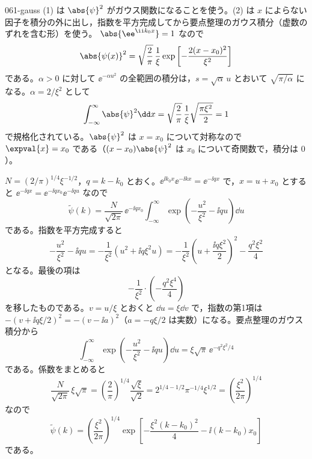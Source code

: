 \documentclass[uplatex,dvipdfmx,a4paper,11pt]{jsarticle}
\begin{document}
\begin{kaisetsu}{061-gauss}
\houshin (1) は $\abs{\psi}^{2}$ がガウス関数になることを使う。(2) は $x$ によらない因子を積分の外に出し，指数を平方完成してから要点整理のガウス積分（虚数のずれを含む形）を使う。
\keisan {} $\abs{\ee^{\ii k_{0}x}}=1$ なので
\[ \abs{\psi(x)}^{2}=\sqrt{\frac{2}{\pi}}\,\frac{1}{\xi}\exp\left[-\frac{2(x-x_{0})^{2}}{\xi^{2}}\right] \]
である。$\alpha>0$ に対して $\ee^{-\alpha u^{2}}$ の全範囲の積分は，$s=\sqrt{\alpha}\,u$ とおいて $\sqrt{\pi/\alpha}$ になる。$\alpha=2/\xi^{2}$ として
\[ \int_{-\infty}^{\infty}\abs{\psi}^{2}\dd x=\sqrt{\frac{2}{\pi}}\,\frac{1}{\xi}\sqrt{\frac{\pi\xi^{2}}{2}}=1 \]
で規格化されている。$\abs{\psi}^{2}$ は $x=x_{0}$ について対称なので $\expval{x}=x_{0}$ である（$(x-x_{0})\abs{\psi}^{2}$ は $x_{0}$ について奇関数で，積分は $0$）。

 $N=(2/\pi)^{1/4}\xi^{-1/2}$，$q=k-k_{0}$ とおく。$\ee^{\ii k_{0}x}\ee^{-\ii kx}=\ee^{-\ii qx}$ で，$x=u+x_{0}$ とすると $\ee^{-\ii qx}=\ee^{-\ii qx_{0}}\ee^{-\ii qu}$ なので
\[ \tilde{\psi}(k)=\frac{N}{\sqrt{2\pi}}\,\ee^{-\ii qx_{0}}\int_{-\infty}^{\infty}\exp\left(-\frac{u^{2}}{\xi^{2}}-\ii qu\right)\dd u \]
である。指数を平方完成すると
\[ -\frac{u^{2}}{\xi^{2}}-\ii qu=-\frac{1}{\xi^{2}}\left(u^{2}+\ii q\xi^{2}u\right)=-\frac{1}{\xi^{2}}\left(u+\frac{\ii q\xi^{2}}{2}\right)^{2}-\frac{q^{2}\xi^{2}}{4} \]
となる。最後の項は
\[ -\frac{1}{\xi^{2}}\cdot\left(-\frac{q^{2}\xi^{4}}{4}\right) \]
を移したものである。$v=u/\xi$ とおくと $\dd u=\xi\dd v$ で，指数の第1項は $-(v+\ii q\xi/2)^{2}=-(v-\ii a)^{2}$（$a=-q\xi/2$ は実数）になる。要点整理のガウス積分から
\[ \int_{-\infty}^{\infty}\exp\left(-\frac{u^{2}}{\xi^{2}}-\ii qu\right)\dd u=\xi\sqrt{\pi}\,\ee^{-q^{2}\xi^{2}/4} \]
である。係数をまとめると
\[ \frac{N}{\sqrt{2\pi}}\,\xi\sqrt{\pi}=\left(\frac{2}{\pi}\right)^{1/4}\frac{\sqrt{\xi}}{\sqrt{2}}=2^{1/4-1/2}\pi^{-1/4}\xi^{1/2}=\left(\frac{\xi^{2}}{2\pi}\right)^{1/4} \]
なので
\[ \tilde{\psi}(k)=\left(\frac{\xi^{2}}{2\pi}\right)^{1/4}\exp\left[-\frac{\xi^{2}(k-k_{0})^{2}}{4}-\ii(k-k_{0})x_{0}\right] \]
である。


\end{kaisetsu}
\end{document}
